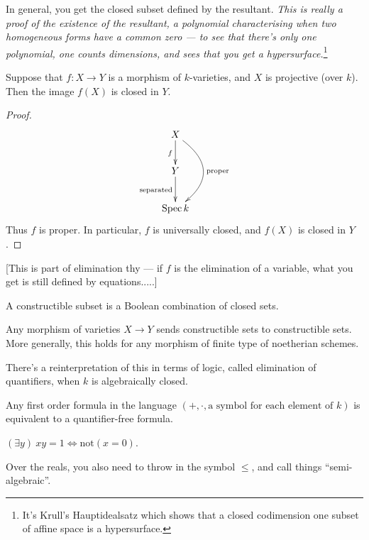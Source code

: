 \documentclass[11pt]{article}
\begin{document}
\begin{Oct20}
\begin{exmp*}
In general, you get the closed subset defined by the resultant. \emph{This is really a proof of the existence of the resultant, a polynomial characterising when two homogeneous forms have a common zero --- to see that there's only one polynomial, one counts dimensions, and sees that you get a hypersurface.}\footnote{It's Krull's Hauptidealsatz which shows that a closed codimension one subset of affine space is a hypersurface.}
\end{exmp*}
\begin{thm*}
Suppose that $f:X\to Y$ is a morphism of $k$-varieties, and $X$ is projective (over $k$). Then the image $f(X)$ is closed in $Y$.
\end{thm*}
\begin{proof}
\[\xymatrix{
X\ar[d]_f\ar@/^1cm/[dd]^{\text{proper}}\\%
Y\ar[d]_{\text{separated}}\\
\spec k
}\]
Thus $f$ is proper. In particular, $f$ is universally closed, and $f(X)$ is closed in $Y$.
\end{proof}
[This is part of elimination thy --- if $f$ is the elimination of a variable, what you get is still defined by equations.....]
\begin{defn*}
A constructible subset is a Boolean combination of closed sets.
\end{defn*}
\begin{thm*}[Chevalley]
Any morphism of varieties $X\to Y$ sends constructible sets to constructible sets. More generally, this holds for any morphism of finite type of noetherian schemes.
\end{thm*}
There's a reinterpretation of this in terms of logic, called elimination of quantifiers, when $k$ is algebraically closed.
\begin{thm*}
Any first order formula in the language $(+,\cdot,\text{a symbol for each element of $k$})$ is equivalent to a quantifier-free formula.
\end{thm*}
\begin{exmp*}
$(\exists y)\ xy=1\iff \text{not}(x=0)$.
\end{exmp*}
\noindent Over the reals, you also need to throw in the symbol $\leq$, and call things ``semi-algebraic''.
\end{Oct20}
\end{document}
